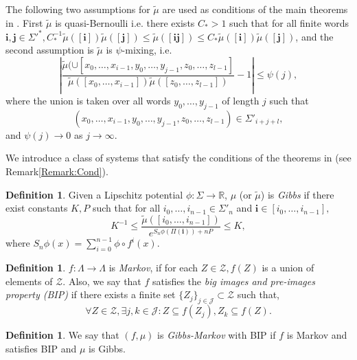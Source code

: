 \documentclass[11pt, reqno]{amsart}
\theoremstyle{plain}%
\theoremstyle{definition}
\newtheorem{definition}[theorem]{Definition}
\theoremstyle{definition}
\def\R{\ensuremath{\mathbb R}}
\numberwithin{equation}{section}
\begin{document}
The following two assumptions for $\tilde{\mu}$ are used as conditions of the main theorems in \cite{MikeNatali}. First $\tilde{\mu}$ is quasi-Bernoulli i.e. there exists $C_*>1$ such that for all finite words $\textbf{i}, \textbf{j} \in \Sigma'^*, C_*^{-1}\tilde{\mu}([\textbf{i}])\tilde{\mu}([\textbf{j}])\le \tilde{\mu}([\textbf{i}\textbf{j}])\le C_*\tilde{\mu}([\textbf{i}])\tilde{\mu}([\textbf{j}])$, and the second assumption is $\tilde{\mu}$ is $\psi$-mixing, i.e. 
\begin{equation}\label{Equ:psi mixing}
    \left|\frac{\tilde{\mu}(\cup[x_0,\ldots,x_{i-1},y_0,\ldots,y_{j-1},z_0,\ldots,z_{l-1}]}{\tilde{\mu}([x_0,\ldots,x_{i-1}])\tilde{\mu}([z_0,\ldots,z_{l-1}])}-1\right|\le \psi(j),
\end{equation}
where the union is taken over all words $y_0, \ldots, y_{j-1}$ of length $j$ such that $$(x_0,\ldots,x_{i-1},y_0,\ldots,y_{j-1},z_0,\ldots,z_{l-1})\in\Sigma'_{i+j+l},$$ and $\psi(j)\to 0$ as $j\to \infty.$ 

We introduce a class of systems that satisfy the conditions of the theorems in \cite{MikeNatali} (see Remark\ref{Remark:Cond}).

\begin{definition}\label{Def:Gibbs}
   Given a Lipschitz potential $\phi:\Sigma\to \R$, $\mu$ (or $\tilde{\mu}$)  is \textit{Gibbs} if there exist constants $K,P$ such that for all $i_0,\ldots,i_{n-1}\in\Sigma'_n$ and $\textbf{i}\in[i_0,\ldots,i_{n-1}],$ $$ K^{-1}\le\frac{\tilde{\mu}([i_0,\ldots,i_{n-1}])}{e^{S_n\phi(\Pi(\textbf{i}))+nP}}\le K,$$
    where $S_n\phi(x)=\sum_{i=0}^{n-1} \phi \circ f^i(x).$
\end{definition}

\begin{definition}\label{Def:BIP}
    $f:\Lambda\to\Lambda$ is  \textit{Markov}, if for each $Z\in\mathcal{Z}, f(Z)$ is a union of elements of $\mathcal{Z}$. Also, we say that $f$ satisfies the \textit{big images and pre-images property (BIP)} if there exists a finite set $\{Z_j\}_{j\in\mathcal{J}}\subset\mathcal{Z}$ such that,
    $$\forall Z\in\mathcal{Z}, \exists j,k\in \mathcal{J} : Z\subseteq f(Z_j),Z_k\subseteq f(Z).$$

\end{definition}

\begin{definition}
    We say that $(f,\mu)$ is \textit{Gibbs-Markov} with BIP if $f$ is Markov and satisfies BIP and $\mu$ is Gibbs.
\end{definition}
\end{document}
